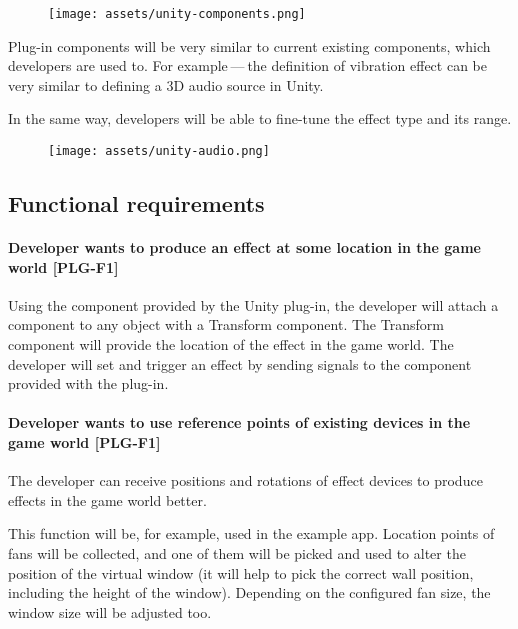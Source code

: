 \begin{figure}[h]{}
\centering\texttt{[image: assets/unity-components.png]}
\caption{}

\end{figure}

Plug-in components will be very similar to current existing components, which
developers are used to. For example — the definition of vibration effect can be
very similar to defining a 3D audio source in Unity.


In the same way, developers will be able to fine-tune the effect type and
its range.


\begin{figure}[h]{}
\centering\texttt{[image: assets/unity-audio.png]}
\caption{}

\end{figure}

\hypertarget{x-functional-requirements}{\subsection{Functional requirements}}
\hypertarget{x-\textbf{developer-wants-to-produce-an-effect-at-some-location-in-the-game-world}-[plg-f1]}{\paragraph*{\textbf{Developer wants to produce an effect at some location in the game world} [PLG-F1]}}
Using the component provided by the Unity plug-in, the developer will attach
a component to any object with a Transform component. The Transform component
will provide the location of the effect in the game world. The developer will
set and trigger an effect by sending signals to the component provided with
the plug-in.


\hypertarget{x-\textbf{developer-wants-to-use-reference-points-of-existing-devices-in-the-game-world}-[plg-f1]}{\paragraph*{\textbf{Developer wants to use reference points of existing devices in the game world} [PLG-F1]}}
The developer can receive
positions and rotations of effect devices to produce effects in the
game world better.


This function will be, for example, used in the example app. Location points of
fans will be collected, and one of them will be picked and used to alter
the position of the virtual window (it will help to pick the correct wall position,
including the height of the window). Depending on the configured fan size,
the window size will be adjusted too.


